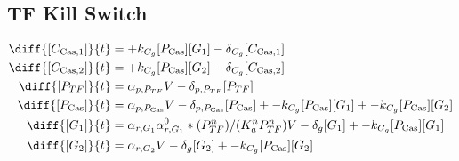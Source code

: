 \subsection{TF Kill Switch}
\label{s:TF_delayed_kill_switch}

\begin{align}
\diff{\conc{\cplx{\cas}{1}}}{t} & =  + \gRnaBind{}\conc{\proSp{\cas{}}}\conc{\gRna{1}} - \casCompDegradeRate{}\conc{\cplx{\cas}{1}}\\ 
\diff{\conc{\cplx{\cas}{2}}}{t} & =  + \gRnaBind{}\conc{\proSp{\cas{}}}\conc{\gRna{2}} - \casCompDegradeRate{}\conc{\cplx{\cas}{2}}\\ 
\diff{\conc{\proSp{TF}}}{t} & =  \txtlRate{\proSp{TF}}\vectorGen{} - \proDegradeRate{\proSp{TF}}\conc{\proSp{TF}}\\ 
\diff{\conc{\proSp{\cas{}}}}{t} & =  \txtlRate{\proSp{\cas{}}}\vectorGen{} - \proDegradeRate{\proSp{\cas{}}}\conc{\proSp{\cas{}}} + - \gRnaBind{}\conc{\proSp{\cas{}}}\conc{\gRna{1}} + - \gRnaBind{}\conc{\proSp{\cas{}}}\conc{\gRna{2}}\\ 
\diff{\conc{\gRna{1}}}{t} & =  \txRate{\gRna{1}}\txRate{G_1}^0*(\proSp{TF}^n) / (K_a^n\proSp{TF}^n)\vectorGen{} - \rnaDegradeRate{}\conc{\gRna{1}} + - \gRnaBind{}\conc{\proSp{\cas{}}}\conc{\gRna{1}}\\ 
\diff{\conc{\gRna{2}}}{t} & =  \txRate{\gRna{2}}\vectorGen{} - \rnaDegradeRate{}\conc{\gRna{2}} + - \gRnaBind{}\conc{\proSp{\cas{}}}\conc{\gRna{2}}
\end{align}

